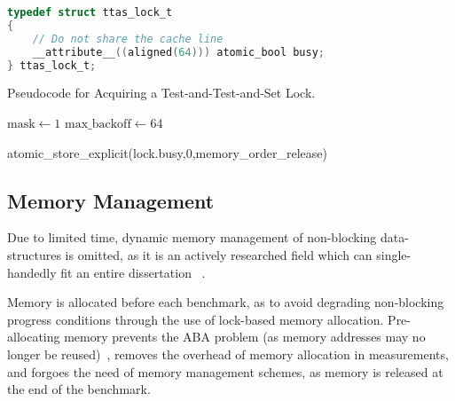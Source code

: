 \begin{lstlisting}[language=C,caption={Test-and-Test-and-Set Lock Struct.}]
typedef struct ttas_lock_t
{
    // Do not share the cache line
    __attribute__((aligned(64))) atomic_bool busy;
} ttas_lock_t;

\end{lstlisting}

\begin{algorithm}
    \caption{Pseudocode for Acquiring a Test-and-Test-and-Set
    Lock.}\label{alg:ttas_acquire}
        $\text{mask} \gets 1$
        $\text{max\_backoff} \gets 64$
            {
            
        }
        atomic\_store\_explicit(lock.busy,0,memory\_order\_release)
\end{algorithm}

\subsection{Memory Management}
Due to limited time, dynamic memory management of non-blocking data-structures
is omitted, as it is an actively researched field which can single-handedly fit
an entire dissertation ~\citep{valois1995datastructures,michael2004hazard}.

Memory is allocated before each benchmark, as to avoid degrading
non-blocking progress conditions through the use of lock-based memory
allocation. Pre-allocating memory prevents the ABA problem (as memory addresses
may no longer be reused)~\citep{dechev2010understanding}, removes the overhead
of memory allocation in measurements, and forgoes the need of memory management
schemes, as memory is released at the end of the benchmark.

